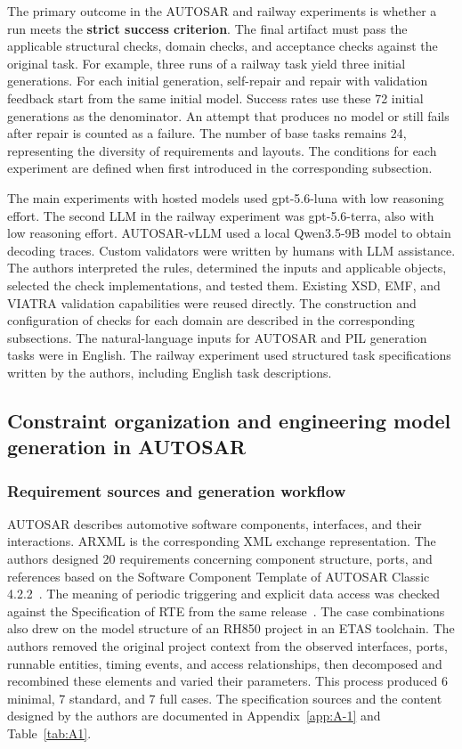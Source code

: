 \documentclass[pdflatex,iicol,sn-mathphys-num]{sn-jnl}
\newcommand{\paperref}[1]{~\citep{#1}}
\begin{document}
The primary outcome in the AUTOSAR and railway experiments is whether a run meets the \textbf{strict success criterion}. The final artifact must pass the applicable structural checks, domain checks, and acceptance checks against the original task. For example, three runs of a railway task yield three initial generations. For each initial generation, self-repair and repair with validation feedback start from the same initial model. Success rates use these 72 initial generations as the denominator. An attempt that produces no model or still fails after repair is counted as a failure. The number of base tasks remains 24, representing the diversity of requirements and layouts. The conditions for each experiment are defined when first introduced in the corresponding subsection.


The main experiments with hosted models used gpt-5.6-luna with low reasoning effort. The second LLM in the railway experiment was gpt-5.6-terra, also with low reasoning effort. AUTOSAR-vLLM used a local Qwen3.5-9B model to obtain decoding traces. Custom validators were written by humans with LLM assistance. The authors interpreted the rules, determined the inputs and applicable objects, selected the check implementations, and tested them. Existing XSD, EMF, and VIATRA validation capabilities were reused directly. The construction and configuration of checks for each domain are described in the corresponding subsections. The natural-language inputs for AUTOSAR and PIL generation tasks were in English. The railway experiment used structured task specifications written by the authors, including English task descriptions.


\subsection{Constraint organization and engineering model generation in AUTOSAR}\label{sec:eval-4-2}

\subsubsection{Requirement sources and generation workflow}\label{sec:eval-4-2-1}

AUTOSAR describes automotive software components, interfaces, and their interactions. ARXML is the corresponding XML exchange representation. The authors designed 20 requirements concerning component structure, ports, and references based on the Software Component Template of AUTOSAR Classic 4.2.2\paperref{AUTOSAR2015SoftwareComponentTemplate422}. The meaning of periodic triggering and explicit data access was checked against the Specification of RTE from the same release\paperref{AUTOSAR2015RTE422}. The case combinations also drew on the model structure of an RH850 project in an ETAS toolchain. The authors removed the original project context from the observed interfaces, ports, runnable entities, timing events, and access relationships, then decomposed and recombined these elements and varied their parameters. This process produced 6 minimal, 7 standard, and 7 full cases. The specification sources and the content designed by the authors are documented in Appendix~\ref{app:A-1} and Table~\ref{tab:A1}.
\end{document}
